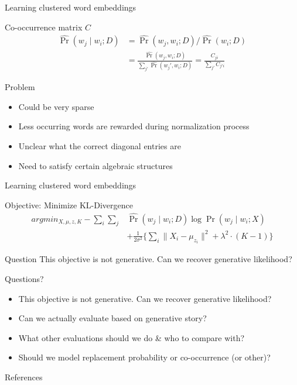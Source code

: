 \documentclass{beamer}
\begin{document}
\begin{frame}{Learning clustered word embeddings}
  \begin{block}{Co-occurrence matrix $C$}
  \begin{align*}
   \hat{\Pr}(w_j \mid w_i ; D) &= \hat{\Pr}(w_j, w_i ; D) / \hat{\Pr}(w_i ; D)\\                             
    & = \frac{\hat{\Pr}(w_j, w_i ; D)}{\sum_{j'} \hat{\Pr}(w_j', w_i ; D)} = \frac{C_{ji}}{\sum_{j'}C_{j'i}}                        
  \end{align*}
  \end{block}
  \pause
  \begin{alertblock}{Problem}
    \begin{itemize}
       \item Could be very sparse
       \item Less occurring words are rewarded during normalization process
       \item Unclear what the correct diagonal entries are
       \item Need to satisfy certain algebraic structures
    \end{itemize}
  \end{alertblock}
\end{frame}




\begin{frame}{Learning clustered word embeddings}
  \begin{block}{Objective: Minimize KL-Divergence}
    \begin{align*}
    argmin_{X, \mu, z, K}  - \sum_i \sum_j & \hat{\Pr}(w_j \mid w_i ; D) \log \Pr(w_j \mid w_i ; X) \\
    &+ \frac{1}{2 \sigma^2} \{ \sum_i \| X_i - \mu_{z_i} \|^2 + \lambda^2 \cdot (K - 1) \} 
    \end{align*}
  \end{block}
  \pause
  \begin{alertblock}{Question}
	This objective is not generative. Can we recover generative likelihood?
  \end{alertblock}
\end{frame}

\begin{frame}{Questions?}
  \begin{itemize}
    \item This objective is not generative. Can we recover generative likelihood?
    \item Can we actually evaluate based on generative story?
    \item What other evaluations should we do \& who to compare with?
    	\item Should we model replacement probability or co-occurrence (or other)?
  \end{itemize}
\end{frame}

\appendix

\begin{frame}[allowframebreaks]{References}
  
  
\end{frame}
\end{document}
